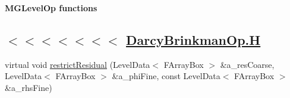 \begin{Indent}{\bf M\-G\-Level\-Op functions}\par
{\em \subsection*{$<$$<$$<$$<$$<$$<$$<$ \hyperlink{_darcy_brinkman_op_8_h_source}{Darcy\-Brinkman\-Op.\-H} }}\begin{DoxyCompactItemize}
\item 
virtual void \hyperlink{class_darcy_brinkman_op_a22da926f24eef3899c539896dc6cc314}{restrict\-Residual} (Level\-Data$<$ F\-Array\-Box $>$ \&a\-\_\-res\-Coarse, Level\-Data$<$ F\-Array\-Box $>$ \&a\-\_\-phi\-Fine, const Level\-Data$<$ F\-Array\-Box $>$ \&a\-\_\-rhs\-Fine)
\end{DoxyCompactItemize}
\end{Indent}

